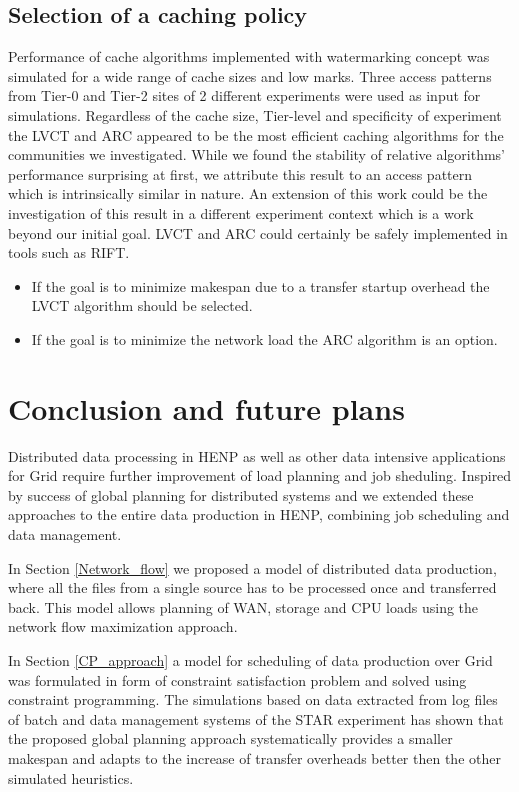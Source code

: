 \documentclass[english]{ddny}
\begin{document}
\subsection{Selection of a caching policy}
Performance of cache algorithms implemented with watermarking concept was simulated for a wide range of cache sizes and low marks. Three access patterns from Tier-0 and Tier-2 sites of 2 different experiments were used as input for simulations.
Regardless of the cache size, Tier-level and specificity of experiment the LVCT and ARC appeared to be the most efficient  caching algorithms for the communities we investigated. While we found the stability of relative  algorithms' performance surprising at first, we attribute this result to an access pattern which is intrinsically similar in nature.
An extension of this work could be the investigation of this result in a different experiment context which is a work beyond our initial goal. LVCT and ARC could certainly be safely implemented in tools such as RIFT.
\begin{itemize}
	\item If the goal is to minimize makespan due to a transfer startup overhead the LVCT algorithm should be selected.
	\item If the goal is to minimize the network load the ARC algorithm is an option.
\end{itemize}



\section{Conclusion and future plans}
Distributed data processing in HENP as well as other data intensive applications for Grid require further improvement of load planning and job sheduling. Inspired by success of global planning for distributed systems \cite{Zerola} and \cite{Rudova} we extended these approaches to the entire data production in HENP, combining job scheduling and data management.  

In Section \ref{Network_flow} we proposed a model of distributed data production, where all the files from a single source has to be processed once and transferred back. This model allows planning of WAN, storage and CPU loads using the network flow maximization approach. 

In Section \ref{CP_approach} a model for scheduling of data production over Grid was formulated in form of constraint satisfaction problem and solved using constraint programming. The simulations based on data extracted from log files of batch and data management systems of the STAR experiment has shown that the proposed global planning approach systematically provides a smaller makespan and adapts to the increase of transfer overheads better then the other simulated  heuristics.
\end{document}
